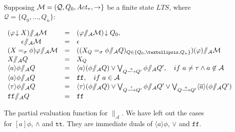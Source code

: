 \documentclass{entcs}
\newcommand{\lts}{\mathit{LTS}}
\newcommand{\dia}[1]{\langle #1 \rangle}
\newcommand{\arco}[1]{\stackrel{#1}{\longrightarrow}}
\newcommand{\quotres}[2]{\slash\!\!\slash_{#1} #2}
\newcommand{\ct}[1]{{\cal #1}}
\newcommand{\frecciagiu}{\! \downarrow}
\newcommand{\alphaset}{\mathcal{A}}
\newcommand{\pdcres}[1]{\|_{#1}}
\newcommand{\mycomp}[1]{\overline{#1}}
\newcommand{\Acttau}{\mathit {Act}_\tau}
\newcommand{\out}[1]{\overline{#1}}
\newcommand{\ltsQ}{\mathcal{Q}}
\newcommand{\ltsq}{Q}
\newcommand{\ltsTR}{\rightarrow}
\newcommand{\true}{\mathtt {tt}}
\newcommand{\false}{\mathtt {ff}}
\begin{document}
\begin{figure}[h]
\hrulefill \\
{\small \noindent Supposing
$\ct{M} = (\ltsQ, \ltsq_0, \Acttau, \ltsTR\}$ be
a finite state $\lts$, where $\ltsQ = \{\ltsq_0, \ldots,
\ltsq_n\}$:%
\begin{center}
$$
\begin{array}{l@{\quad = \quad}ll}
     (\varphi \frecciagiu X)\quotres{\cal A}{\ct{M}} &  (\varphi
     \quotres{\cal A}{\ct{M}})\frecciagiu Q_{0},
\\[0.2ex]
     \qquad  \epsilon\quotres{\cal A}{\ct{M}} & \epsilon
\\[0.2ex]
(X=_{\sigma} \phi) \varphi \quotres{\cal A}{\ct{M}} &
((X_{Q}=_{\sigma} \phi\quotres{\cal A}{Q})_{Q \in \{Q_{0},\ldots ,Q_{n}\}})(\varphi )\quotres{\cal A}{\ct{M}}
\\[0.2ex]
X \quotres{\cal A}{Q} & X_{Q}
\\[0.2ex]
\dia{a}\phi \quotres{\cal A}{Q}  &  \dia{a}(\phi\quotres{\cal A}{Q})\vee
\bigvee_{Q\arco{a} Q'}  \phi\quotres{\cal A}{Q'},
\ \ \ {\rm if\ } a\not =\tau \wedge a\not \in \alphaset
\\[0.2ex]
\dia{a}\phi \quotres{\cal A}{Q}  &  {\false},\ \ \ {\rm if\ } a\in \alphaset
\\[0.2ex]
\dia{\tau} \phi \quotres{\cal A}{Q} &  \dia{\tau}(\phi\quotres{\cal A}{Q}) \vee
\bigvee_{Q\arco{\tau} Q'} \phi\quotres{\cal A}{Q'}
\vee \bigvee_{Q\arco{a} Q'} \dia{\mycomp{a}}(\phi  \quotres{\cal A}{Q'})
\\[0.2ex]
     {\false}\quotres{\cal A}{Q} & {\false}
\end{array}
$$
\end{center}}
\vspace{-0.3cm}
\hrulefill
\caption{The partial evaluation function for $\pdcres{\alphaset}$. We have
  left out the cases for $[a]\phi$, $\wedge$ and $\true$. They are
  immediate duals of $\dia{a}\phi$, $\vee$ and $\false$.}
\protect{\label{tableparev1:table}}
\end{figure}
\end{document}
